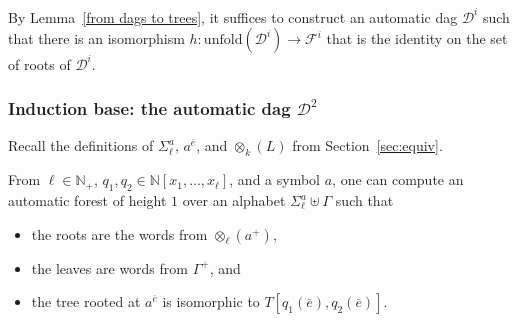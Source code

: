 \documentclass[envcountsame]{llncs}
\newcommand{\unfold}{\mathrm{unfold}}
\newcommand{\N}{\mathbb N}
\begin{document}
By Lemma~\ref{from dags to trees}, it suffices to construct an
automatic dag $\mathcal{D}^i$ such that there is an isomorphism
$h:\unfold(\mathcal{D}^i) \to \mathcal F^i$ that is the identity on
the set of roots of $\mathcal D^i$.

\subsubsection{Induction base: the automatic dag $\mathcal D^2$}

Recall the definitions of
$\Sigma_\ell^a$, $a^{\overline e}$,
and $\otimes_k(L)$ from Section~\ref{sec:equiv}.


\begin{lemma}\label{L1}
  From $\ell\in\N_+$, $q_1,q_2\in\N[x_1,\dots,x_\ell]$, and
  a symbol $a$, one can compute an automatic
  forest of height $1$ over an alphabet
  $\Sigma_\ell^a \uplus\Gamma$ such that
  \begin{itemize}
  \item the roots are the words from $\otimes_\ell(a^+)$,
  \item the leaves are words from $\Gamma^+$, and
  \item the tree rooted at $a^{\overline{e}}$ is
    isomorphic to $T[q_1(\overline e),q_2(\overline e)]$.
  \end{itemize}
\end{lemma}
\end{document}
